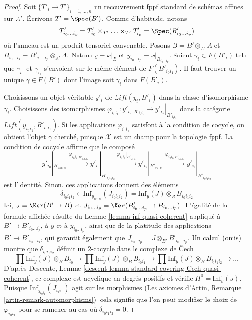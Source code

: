 \begin{proof}
Soit $\{T'_i \to T'\}_{i = 1, \ldots, n}$ un recouvrement fppf standard
de schémas affines sur $A'$. Écrivons $T' = \Spec(B')$. Comme d'habitude, notons
$$
T'_{i_0 \ldots i_p} =
T'_{i_0} \times_{T'} \ldots \times_{T'} T'_{i_p} = \Spec(B'_{i_0 \ldots i_p})
$$
où l'anneau est un produit tensoriel convenable.
Posons $B = B' \otimes_{A'} A$ et
$B_{i_0 \ldots i_p} = B'_{i_0 \ldots i_p} \otimes_{A'} A$.
Notons $y = x|_B$ et $y_{i_0 \ldots i_p} = x|_{B_{i_0 \ldots i_p}}$.
Soient $\gamma_i \in F(B'_i)$ tels que $\gamma_{i_0}$ et $\gamma_{i_1}$
s'envoient sur le même élément de $F(B'_{i_0i_1})$.
Il faut trouver un unique $\gamma \in F(B')$ dont l'image soit
$\gamma_i$ dans $F(B'_i)$.

\medskip\noindent
Choisissons un objet véritable $y'_i$ de $\textit{Lift}(y_i, B'_i)$
dans la classe d'isomorphisme $\gamma_i$.
Choisissons des isomorphismes
$\varphi_{i_0i_1} : y'_{i_0}|_{B'_{i_0i_1}} \to y'_{i_1}|_{B'_{i_0i_1}}$
dans la catégorie $\textit{Lift}(y_{i_0i_1}, B'_{i_0i_1})$.
Si les applications $\varphi_{i_0i_1}$ satisfont à la condition de cocycle,
on obtient l'objet $\gamma$ cherché, puisque $\mathcal{X}$ est
un champ pour la topologie fppf. La condition de cocycle affirme que le
composé
$$
y'_{i_0}|_{B'_{i_0i_1i_2}}
\xrightarrow{\varphi_{i_0i_1}|_{B'_{i_0i_1i_2}}}
y'_{i_1}|_{B'_{i_0i_1i_2}}
\xrightarrow{\varphi_{i_1i_2}|_{B'_{i_0i_1i_2}}}
y'_{i_2}|_{B'_{i_0i_1i_2}}
\xrightarrow{\varphi_{i_2i_0}|_{B'_{i_0i_1i_2}}}
y'_{i_0}|_{B'_{i_0i_1i_2}}
$$
est l'identité. Sinon, ces applications donnent des éléments
$$
\delta_{i_0i_1i_2} \in
\text{Inf}_{y_{i_0i_1i_2}}(J_{i_0i_1i_2}) =
\text{Inf}_y(J) \otimes_B B_{i_0i_1i_2}
$$
Ici, $J = \Ker(B' \to B)$ et
$J_{i_0 \ldots i_p} = \Ker(B'_{i_0 \ldots i_p} \to B_{i_0 \ldots i_p})$.
L'égalité de la formule affichée résulte du
Lemme \ref{lemma-inf-quasi-coherent} appliqué à
$B' \to B'_{i_0 \ldots i_p}$, à $y$ et à $y_{i_0 \ldots i_p}$,
ainsi que de la platitude des applications $B' \to B'_{i_0 \ldots i_p}$,
qui garantit également que
$J_{i_0 \ldots i_p} = J \otimes_{B'} B'_{i_0 \ldots i_p}$.
Un calcul (omis) montre que $\delta_{i_0i_1i_2}$ définit
un $2$-cocycle dans le complexe de {\v C}ech
$$
\prod \text{Inf}_y(J) \otimes_B B_{i_0} \to
\prod \text{Inf}_y(J) \otimes_B B_{i_0i_1} \to
\prod \text{Inf}_y(J) \otimes_B B_{i_0i_1i_2} \to \ldots
$$
D'après Descente, Lemme \ref{descent-lemma-standard-covering-Cech-quasi-coherent},
ce complexe est acyclique en degrés positifs et vérifie $H^0 = \text{Inf}_y(J)$.
Puisque $\text{Inf}_{y_{i_0i_1}}(J_{i_0i_1})$ agit sur les
morphismes (Les axiomes d'Artin, Remarque \ref{artin-remark-automorphisms}),
cela signifie que l'on peut modifier le choix de $\varphi_{i_0i_1}$
pour se ramener au cas où $\delta_{i_0i_1i_2} = 0$.


\end{proof}
